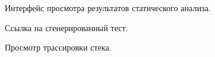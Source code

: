 
\begin{figure}[ht]
\begin{flushleft}
\caption{
\label{problems-view} Интерфейс просмотра результатов статического анализа.}
\end{flushleft}
\end{figure}

\begin{figure}[ht]
\begin{flushleft}
\caption{
\label{problems-view-test} Ссылка на сгенерированный тест.}
\end{flushleft}
\end{figure}

\begin{figure}[ht]
\begin{flushleft}
\caption{
\label{problems-view-stacktrace} Просмотр трассировки стека.}
\end{flushleft}
\end{figure}

